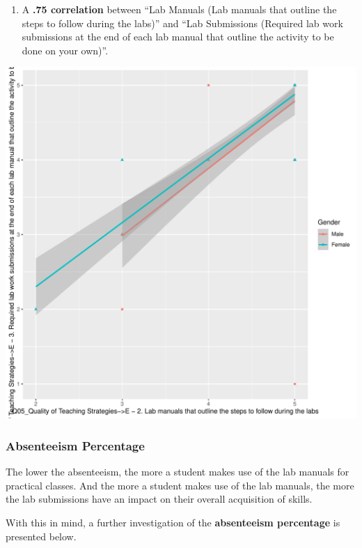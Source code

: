 \documentclass[
]{article}
\providecommand{\tightlist}{%
  \setlength{\itemsep}{0pt}\setlength{\parskip}{0pt}}
\begin{document}
\begin{enumerate}
\def\labelenumi{(\arabic{enumi})}
\setcounter{enumi}{1}
\tightlist
\item
  A \textbf{.75 correlation} between ``Lab Manuals (Lab manuals that
  outline the steps to follow during the labs)'' and ``Lab Submissions
  (Required lab work submissions at the end of each lab manual that
  outline the activity to be done on your own)''.
\end{enumerate}

\includegraphics{10.b.BBT4206-End-SemesterCourseEvaluation-20230821-20231128-BI2-BBIT4-2_files/figure-latex/DrillDownCorr2-1.pdf}

\newpage

\subsubsection{Absenteeism Percentage}\label{absenteeism-percentage}

The lower the absenteeism, the more a student makes use of the lab
manuals for practical classes. And the more a student makes use of the
lab manuals, the more the lab submissions have an impact on their
overall acquisition of skills.

With this in mind, a further investigation of the \textbf{absenteeism
percentage} is presented below.
\end{document}

